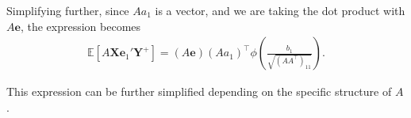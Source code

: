 \documentclass[10pt,a4paper,reqno]{amsart}
\theoremstyle{example}
\begin{document}
Simplifying further, since \(A a_{1}\) is a vector, and we are taking the dot product with \(A \mathbf{e}\), the expression becomes
\begin{align*}
\mathbb{E}\left[ A \mathbf{X} \mathbf{e}_1' \mathbf{Y}^+ \right] = \left( A \mathbf{e} \right) \left( A a_{1} \right)^\intercal \phi\left( \frac{b_1}{\sqrt{(AA^\intercal)_{11}}} \right).
\end{align*}

This expression can be further simplified depending on the specific structure of
\(A\). 



\newpage


\end{document}
